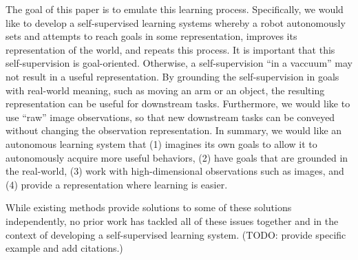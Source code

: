 The goal of this paper is to emulate this learning process.
Specifically, we would like to develop a self-supervised learning systems whereby a robot autonomously sets and attempts to reach goals in some representation, improves its representation of the world, and repeats this process.
It is important that this self-supervision is goal-oriented.
Otherwise, a self-supervision ``in a vaccuum'' may not result in a useful representation.
By grounding the self-supervision in goals with real-world meaning, such as moving an arm or an object, the resulting representation can be useful for downstream tasks.
Furthermore, we would like to use ``raw'' image observations, so that new downstream tasks can be conveyed without changing the observation representation.
In summary, we would like an autonomous learning system that (1) imagines its own goals to allow it to autonomously acquire more useful behaviors, (2) have goals that are grounded in the real-world, (3) work with high-dimensional observations such as images, and (4) provide a representation where learning is easier.

While existing methods provide solutions to some of these solutions independently, no prior work has tackled all of these issues together and in the context of developing a self-supervised learning system. (TODO: provide specific example and add citations.)


